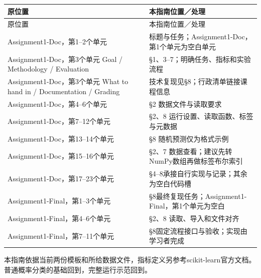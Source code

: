 \begingroup
\small\setlength{\tabcolsep}{3pt}
\renewcommand{\arraystretch}{1.22}
\begin{longtable}{@{}>{\raggedright\arraybackslash}p{}>{\raggedright\arraybackslash}p{}@{}}
\toprule
原位置 & 本指南位置／处理 \\
\midrule\endfirsthead
原位置 & 本指南位置／处理 \\
\midrule\endhead
\bottomrule\endfoot
Assignment1-Doc，第1–2个单元 & 标题与任务；Assignment1-Doc，第1个单元为空白单元 \\
Assignment1-Doc，第3个单元 Goal / Methodology / Evaluation & §1、3–7；明确任务、指标和实验流程 \\
Assignment1-Doc，第3个单元 What to hand in / Documentation / Grading & 技术复现见§8；行政清单链接课程信息 \\
Assignment1-Doc，第4–6个单元 & §2 数据文件与读取要求 \\
Assignment1-Doc，第7–12个单元 & §2、8 运行设置、读取函数、标签与元数据 \\
Assignment1-Doc，第13–14个单元 & §8 随机预测仅为格式示例 \\
Assignment1-Doc，第15–16个单元 & §2、7 数据查看；建议先转NumPy数组再做标签布尔索引 \\
Assignment1-Doc，第17–23个单元 & §4–8承接自行实现与记录；其余为空白代码槽 \\
Assignment1-Final，第1–3个单元 & §8最终复现任务；Assignment1-Final，第1个单元为空白 \\
Assignment1-Final，第4–6个单元 & §2、8 读取、导入和文件对齐 \\
Assignment1-Final，第7–11个单元 & §8固定流程接口与验收；实现由学习者完成 \\
\end{longtable}
\endgroup


本指南依据当前两份模板和所给数据文件，指标定义另参考scikit-learn官方文档。普通概率分类的基础回到，完整运行示范回到。
